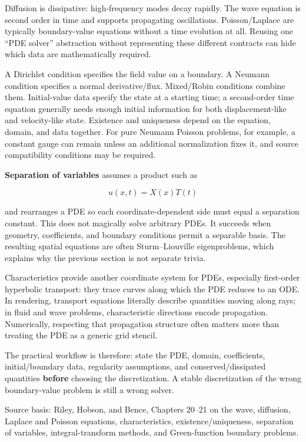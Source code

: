 Diffusion is dissipative: high-frequency modes decay rapidly. The wave equation is second order in time and supports propagating oscillations. Poisson/Laplace are typically boundary-value equations without a time evolution at all. Reusing one ``PDE solver'' abstraction without representing these different contracts can hide which data are mathematically required.

A Dirichlet condition specifies the field value on a boundary. A Neumann condition specifies a normal derivative/flux. Mixed/Robin conditions combine them. Initial-value data specify the state at a starting time; a second-order time equation generally needs enough initial information for both displacement-like and velocity-like state. Existence and uniqueness depend on the equation, domain, and data together. For pure Neumann Poisson problems, for example, a constant gauge can remain unless an additional normalization fixes it, and source compatibility conditions may be required.

\textbf{Separation of variables} assumes a product such as

\[
u(x,t)=X(x)T(t)
\]

and rearranges a PDE so each coordinate-dependent side must equal a separation constant. This does not magically solve arbitrary PDEs. It succeeds when geometry, coefficients, and boundary conditions permit a separable basis. The resulting spatial equations are often Sturm--Liouville eigenproblems, which explains why the previous section is not separate trivia.

Characteristics provide another coordinate system for PDEs, especially first-order hyperbolic transport: they trace curves along which the PDE reduces to an ODE. In rendering, transport equations literally describe quantities moving along rays; in fluid and wave problems, characteristic directions encode propagation. Numerically, respecting that propagation structure often matters more than treating the PDE as a generic grid stencil.

The practical workflow is therefore: state the PDE, domain, coefficients, initial/boundary data, regularity assumptions, and conserved/dissipated quantities \textbf{before} choosing the discretization. A stable discretization of the wrong boundary-value problem is still a wrong solver.

Source basis: Riley, Hobson, and Bence, Chapters 20--21 on the wave, diffusion, Laplace and Poisson equations, characteristics, existence/uniqueness, separation of variables, integral-transform methods, and Green-function boundary problems.

